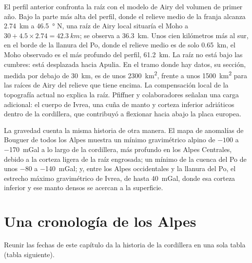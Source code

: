 El perfil anterior confronta la raíz con el modelo de Airy del volumen de primer
año. Bajo la parte más alta del perfil, donde el relieve medio de la franja alcanza
\qty{2.74}{km} a \qty{46.5}{\degree} N, una raíz de Airy local situaría el Moho a
$30 + 4.5 \times 2.74 = \qty{42.3}{km}$; se observa a \qty{36.3}{km}. Unos cien
kilómetros más al sur, en el borde de la llanura del Po, donde el relieve medio es de solo
\qty{0.65}{km}, el Moho observado es el más profundo del perfil, \qty{61.2}{km}. La raíz no está bajo las cumbres:
está desplazada hacia Apulia. En el tramo donde hay datos, su sección, medida
por debajo de \qty{30}{km}, es de unos \qty{2300}{km^2}, frente a unos \qty{1500}{km^2} para las raíces de Airy
del relieve que tiene encima. La compensación local de la topografía actual no
explica la raíz. Pfiffner y colaboradores señalan una carga adicional: el cuerpo de Ivrea, una cuña de
manto y corteza inferior adriáticos dentro de la cordillera, que contribuyó a flexionar hacia abajo la placa
europea.

La gravedad cuenta la misma historia de otra manera. El mapa de anomalías de Bouguer de todos los Alpes muestra un
mínimo gravimétrico alpino de $-100$ a \qty{-170}{mGal} a lo largo de la cordillera, más profundo en los Alpes
Centrales, debido a la corteza ligera de la raíz engrosada; un mínimo de la cuenca del Po de unos $-80$ a
\qty{-140}{mGal}; y, entre los Alpes occidentales y la llanura del Po, el estrecho máximo gravimétrico
de Ivrea, de hasta \qty{+40}{mGal}, donde esa corteza inferior y ese manto densos se acercan a la
superficie.

\section{Una cronología de los Alpes}\label{sec:b2:alpine-orogen:timeline}

Reunir las fechas de este capítulo da la historia de la cordillera en una sola tabla
(tabla siguiente).

